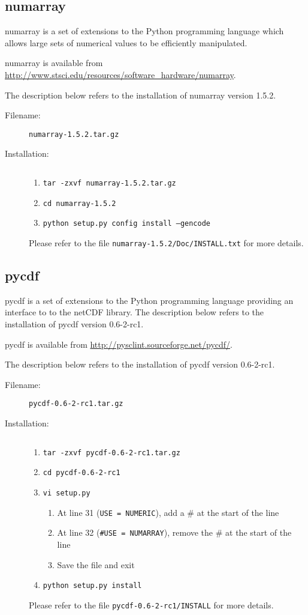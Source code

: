\subsection{numarray}

numarray is a set of extensions to the Python programming language which
allows large sets of numerical values to be efficiently manipulated.

numarray is available from \url{http://www.stsci.edu/resources/software_hardware/numarray}.

The description below refers to the installation of numarray version
1.5.2.

\begin{description}
\item [Filename:] {\tt numarray-1.5.2.tar.gz}
\item [Installation:] $ $
  \begin{enumerate}
  \item {\tt tar -zxvf numarray-1.5.2.tar.gz}
  \item {\tt cd numarray-1.5.2}
  \item {\tt python setup.py config install --gencode}
  \end{enumerate}
Please refer to the file {\tt numarray-1.5.2/Doc/INSTALL.txt} for more
details.
\end{description}

\subsection{pycdf}

pycdf is a set of extensions to the Python programming language
providing an interface to to the netCDF library. The description
below refers to the installation of pycdf version 0.6-2-rc1.

pycdf is available from \url{http://pysclint.sourceforge.net/pycdf/}.

The description below refers to the installation of pycdf version
0.6-2-rc1.

\begin{description}
\item [Filename:] {\tt pycdf-0.6-2-rc1.tar.gz}
\item [Installation:] $ $
  \begin{enumerate}
  \item {\tt tar -zxvf pycdf-0.6-2-rc1.tar.gz}
  \item {\tt cd pycdf-0.6-2-rc1}
  \item {\tt vi setup.py}
    \begin{enumerate}
    \item At line 31 ({\tt USE = NUMERIC}), add a \# at the start of the line
    \item At line 32 ({\tt \#USE = NUMARRAY}), remove the \# at the start
    of the line
    \item Save the file and exit
    \end{enumerate}
  \item {\tt python setup.py install}
  \end{enumerate}
Please refer to the file {\tt pycdf-0.6-2-rc1/INSTALL} for more details.
\end{description}

